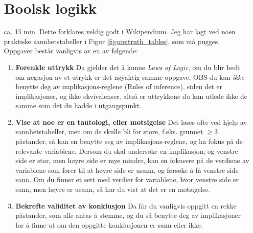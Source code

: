 \section{Boolsk logikk}

ca. 15 min.
Dette forklares veldig godt i \href{https://www.wikipendium.no/MA0301_Elementary_Discrete_Mathematics#logic}{Wikipendium}.
Jeg har lagt ved noen praktiske sannhetstabeller i Figur \ref{figure:truth_tables}, som må pugges.\\

\noindent Oppgaver består vanligvis av en av følgende:
\begin{enumerate}
    \item \textbf{Forenkle uttrykk} Da gjelder det å kunne \textit{Laws of Logic}, om du blir
    bedt om negasjon av et utrykk er det nøyaktig samme oppgave.
    OBS du kan \textit{ikke} benytte deg av implikasjons-reglene (Rules of inference),
    siden det er implikasjoner, og ikke ekvivalenser, altså er uttrykkene du kan utlede ikke 
    de samme som det du hadde i utgangspunkt. 
    \item \textbf{Vise at noe er en tautologi, eller motsigelse} Det løses ofte ved hjelp av 
    sannhetstabeller, men om de skulle bli for store, f.eks. grunnet $\geq 3$ påstander, så kan en 
    benytte seg av implikasjons-reglene, og ha fokus på de relevante variablene. Dersom du skal undersøke en implikasjon,
    og venstre side er stor, men høyre side er mye mindre, kan en fokusere på de verdiene av 
    variablene som fører til at høyre side er usann, og forsøke å få venstre side sann. Om du finner et sett med
    verdier for variablene, hvor venstre side er sann, men høyre er usann, så har du vist at det er en motsigelse.
    \item \textbf{Bekrefte validitet av konklusjon} Da får du vanligvis oppgitt en rekke påstander, som alle antas å stemme,
    og du så benytte deg av implikasjoner for å finne ut om den oppgitte konklusjonen er sann eller ikke.
\end{enumerate}

